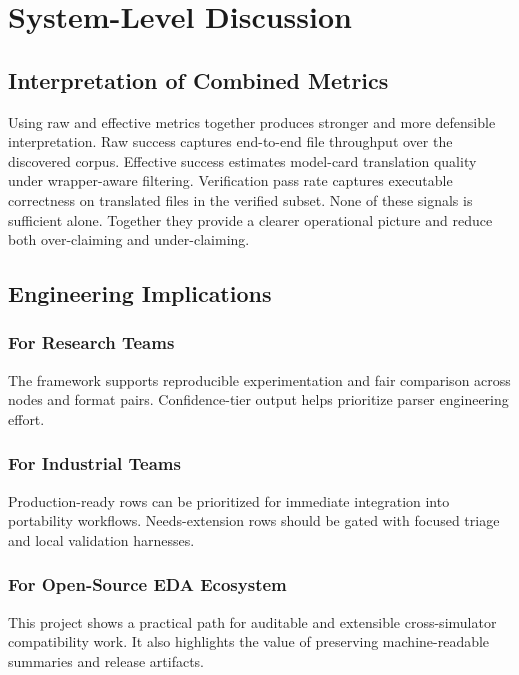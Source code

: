 \documentclass[12pt,a4paper,oneside]{report}
\begin{document}
\chapter{System-Level Discussion}

\section{Interpretation of Combined Metrics}
Using raw and effective metrics together produces stronger and more defensible interpretation. Raw success captures end-to-end file throughput over the discovered corpus. Effective success estimates model-card translation quality under wrapper-aware filtering. Verification pass rate captures executable correctness on translated files in the verified subset. None of these signals is sufficient alone. Together they provide a clearer operational picture and reduce both over-claiming and under-claiming.

\section{Engineering Implications}
\subsection{For Research Teams}
The framework supports reproducible experimentation and fair comparison across nodes and format pairs. Confidence-tier output helps prioritize parser engineering effort.

\subsection{For Industrial Teams}
Production-ready rows can be prioritized for immediate integration into portability workflows. Needs-extension rows should be gated with focused triage and local validation harnesses.

\subsection{For Open-Source EDA Ecosystem}
This project shows a practical path for auditable and extensible cross-simulator compatibility work. It also highlights the value of preserving machine-readable summaries and release artifacts.
\end{document}

